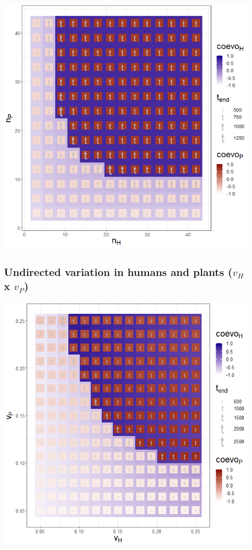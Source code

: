 \documentclass[
]{book}
\begin{document}
\includegraphics[width=1\linewidth]{plots/3_twoPar-n.H-n.P_plot}

\newpage

\hypertarget{undirected-variation-in-humans-and-plants-v_h-x-v_p}{%
\subsection{\texorpdfstring{Undirected variation in humans and plants (\(v_{H}\) x \(v_{P}\))}{Undirected variation in humans and plants (v\_\{H\} x v\_\{P\})}}\label{undirected-variation-in-humans-and-plants-v_h-x-v_p}}


\includegraphics[width=1\linewidth]{plots/3_twoPar-v.H-v.P_plot}
\end{document}
